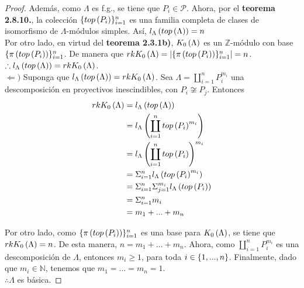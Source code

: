 \documentclass{article}
\begin{document}
\begin{enumerate}[label=\textbf{Ej \arabic*.}]
\begin{proof}
			Además, como $\Lambda$ es f.g., se tiene que $P_{i}\in\mathcal{P}$. Ahora, por el \textbf{teorema 2.8.10.}, la colección $\{top\left(P_{i}\right)\}_{i=1}^{n}$ es una familia completa de clases de isomorfismo de $\Lambda$-módulos simples. Así, $l_{\Lambda}\left(top\left(\Lambda\right)\right)=n$\\
		
			Por otro lado, en virtud del \textbf{teorema 2.3.1b)}, $K_{0}\left(\Lambda\right)$ es un $\mathbb{Z}$-módulo con base $\{\pi\left(top\left(P_{i}\right)\right)\}_{i=1}^{n}$. De manera que $rkK_{0}\left(\Lambda\right)=\left|\{\pi\left(top\left(P_{i}\right)\right)\}_{i=1}^{n}\right|=n$.\\
			$\therefore l_{\Lambda}\left(top\left(\Lambda\right)\right)=rkK_{0}\left(\Lambda\right)$.\\
		
			$\boxed{\Leftarrow )}$ Suponga que $l_{\Lambda}\left(top\left(\Lambda\right)\right)=rkK_{0}\left(\Lambda\right)$. Sea $\Lambda=\displaystyle\coprod_{i=1}^{n}P_{i}^{m_{i}}$ una descomposición en proyectivos inescindibles, con $P_{i} \not\cong P_{j}$. Entonces
			\begin{align*}
				rkK_{0}\left(\Lambda\right)&=l_{\Lambda}\left(top\left(\Lambda\right)\right)\\
				&=l_{\Lambda}\left(\displaystyle\coprod_{i=1}^{n}top\left(P_{i}\right)^{m_{i}}\right)\\
				&=l_{\Lambda}\left(\displaystyle\coprod_{i=1}^{n}top\left(P_{i}\right)\right)^{m_{i}}\\
				&=\displaystyle\Sigma_{i=1}^{n}l_{\Lambda}\left(top\left(P_{i}\right)^{m_{i}}\right)\\
				&=\displaystyle\Sigma_{i=1}^{n}\displaystyle\Sigma_{j=1}^{m_{i}}l_{\Lambda}\left(top\left(P_{i}\right)\right)\\
				&=\displaystyle\Sigma_{i=1}^{n}m_{i}\\
				&=m_{1}+...+m_{n}
			\end{align*}
		
			Por otro lado, como $\{\pi\left(top\left(P_{i}\right)\right)\}_{i=1}^{n}$ es una base para $K_{0}\left(\Lambda\right)$, se tiene que $rkK_{0}\left(\Lambda\right)=n$. De esta manera, $n=m_{1}+...+m_{n}$. Ahora, como $\displaystyle\coprod_{i=1}^{n}P_{i}^{m_{i}}$ es una descomposición de $\Lambda$, entonces $m_{i} \geq 1$, para toda $i\in\left\{1,...,n\right\}$. Finalmente, dado que $m_{i}\in\mathbb{N}$, tenemos que $m_{1}=...=m_{n}=1$.\\
			$\therefore\Lambda$ es básica.
		\end{proof}
		

\end{enumerate}
\end{document}
